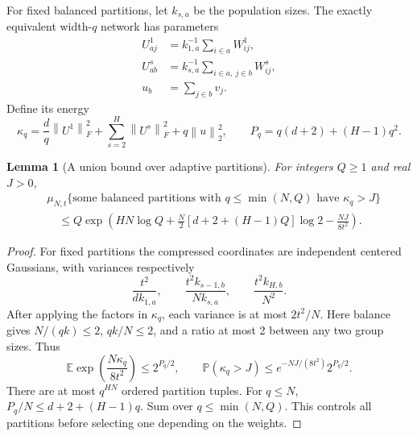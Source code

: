 \documentclass[11pt]{article}
\newtheorem{lemma}[theorem]{Lemma}
\newcommand{\E}{\mathbb E}
\newcommand{\Prb}{\mathbb P}
\newcommand{\norm}[1]{\left\|#1\right\|}
\begin{document}
For fixed balanced partitions, let $k_{s,a}$ be the population sizes.
The exactly equivalent width-$q$ network has parameters
\begin{align*}
 U^1_{aj}&=k_{1,a}^{-1}\sum_{i\in a}W^1_{ij},\\
 U^s_{ab}&=k_{s,a}^{-1}\sum_{i\in a,\ j\in b}W^s_{ij},\\
 u_b&=\sum_{j\in b}v_j.
\end{align*}
Define its energy
\[
 \kappa_q=\frac dq\norm{U^1}_F^2+
           \sum_{s=2}^H\norm{U^s}_F^2+q\norm u_2^2,
 \qquad P_q=q(d+2)+(H-1)q^2.
\]

\begin{lemma}[A union bound over adaptive partitions]\label{lem:partitions}
For integers $Q\ge1$ and real $J>0$,
\begin{align*}
 &\mu_{N,t}\{\text{some balanced partitions with }q\le\min(N,Q)
                         \text{ have }\kappa_q>J\}\\
 &\quad\le Q\exp\left(HN\log Q+
      \frac N2[d+2+(H-1)Q]\log2-\frac{NJ}{8t^2}\right).
\end{align*}
\end{lemma}
\begin{proof}
For fixed partitions the compressed coordinates are independent centered
Gaussians, with variances respectively
\[
 \frac{t^2}{dk_{1,a}},\qquad
 \frac{t^2k_{s-1,b}}{Nk_{s,a}},\qquad
 \frac{t^2k_{H,b}}{N^2}.
\]
After applying the factors in $\kappa_q$, each variance is at most
$2t^2/N$. Here balance gives $N/(qk)\le2$, $qk/N\le2$, and a ratio at
most 2 between any two group sizes. Thus
\[
 \E\exp\left(\frac{N\kappa_q}{8t^2}\right)\le2^{P_q/2},\qquad
 \Prb(\kappa_q>J)\le e^{-NJ/(8t^2)}2^{P_q/2}.
\]
There are at most $q^{HN}$ ordered partition tuples. For $q\le N$,
$P_q/N\le d+2+(H-1)q$. Sum over $q\le\min(N,Q)$.
This controls all partitions before selecting one depending on the weights.
\end{proof}
\end{document}
